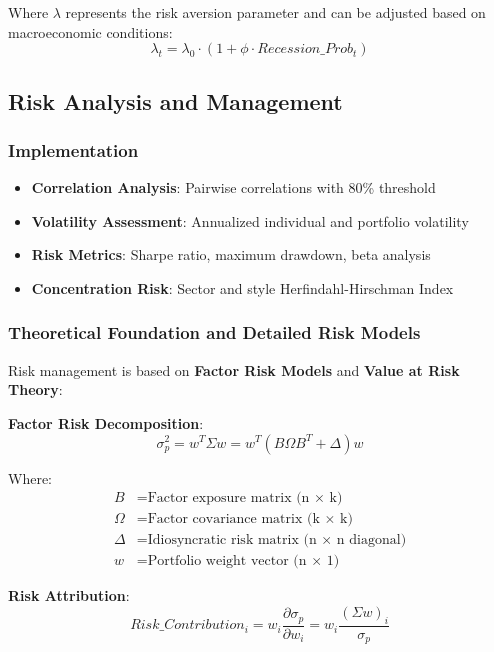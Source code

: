 \documentclass[12pt,a4paper]{article}
\begin{document}
Where $\lambda$ represents the risk aversion parameter and can be adjusted based on macroeconomic conditions:
\begin{equation}
\lambda_t = \lambda_0 \cdot (1 + \phi \cdot Recession\_Prob_t)
\end{equation}

\subsection{Risk Analysis and Management}

\subsubsection{Implementation}
\begin{itemize}
    \item \textbf{Correlation Analysis}: Pairwise correlations with 80\% threshold
    \item \textbf{Volatility Assessment}: Annualized individual and portfolio volatility
    \item \textbf{Risk Metrics}: Sharpe ratio, maximum drawdown, beta analysis
    \item \textbf{Concentration Risk}: Sector and style Herfindahl-Hirschman Index
\end{itemize}

\subsubsection{Theoretical Foundation and Detailed Risk Models}
Risk management is based on \textbf{Factor Risk Models} and \textbf{Value at Risk Theory}:

\textbf{Factor Risk Decomposition}:
\begin{equation}
\sigma_p^2 = w^T \Sigma w = w^T (B \Omega B^T + \Delta) w
\end{equation}

Where:
\begin{align}
B &= \text{Factor exposure matrix (n × k)} \\
\Omega &= \text{Factor covariance matrix (k × k)} \\
\Delta &= \text{Idiosyncratic risk matrix (n × n diagonal)} \\
w &= \text{Portfolio weight vector (n × 1)}
\end{align}

\textbf{Risk Attribution}:
\begin{equation}
Risk\_Contribution_i = w_i \frac{\partial \sigma_p}{\partial w_i} = w_i \frac{(\Sigma w)_i}{\sigma_p}
\end{equation}
\end{document}
